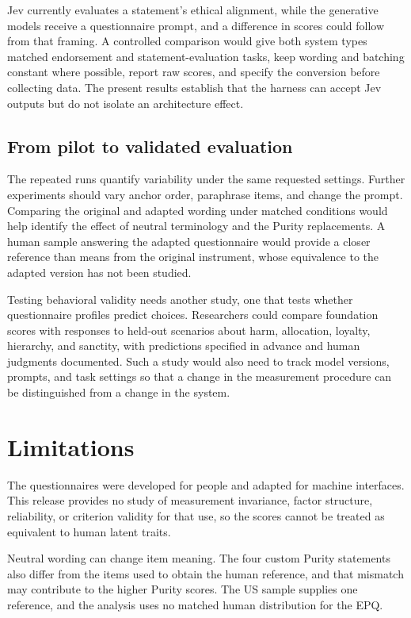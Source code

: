 \documentclass[11pt]{article}
\begin{document}
Jev currently evaluates a statement's ethical alignment, while the generative models receive a questionnaire prompt, and a difference in scores could follow from that framing. A controlled comparison would give both system types matched endorsement and statement-evaluation tasks, keep wording and batching constant where possible, report raw scores, and specify the conversion before collecting data. The present results establish that the harness can accept Jev outputs but do not isolate an architecture effect.

\subsection{From pilot to validated evaluation}
The repeated runs quantify variability under the same requested settings. Further experiments should vary anchor order, paraphrase items, and change the prompt. Comparing the original and adapted wording under matched conditions would help identify the effect of neutral terminology and the Purity replacements. A human sample answering the adapted questionnaire would provide a closer reference than means from the original instrument, whose equivalence to the adapted version has not been studied.

Testing behavioral validity needs another study, one that tests whether questionnaire profiles predict choices. Researchers could compare foundation scores with responses to held-out scenarios about harm, allocation, loyalty, hierarchy, and sanctity, with predictions specified in advance and human judgments documented. Such a study would also need to track model versions, prompts, and task settings so that a change in the measurement procedure can be distinguished from a change in the system.

\section{Limitations}
The questionnaires were developed for people and adapted for machine interfaces. This release provides no study of measurement invariance, factor structure, reliability, or criterion validity for that use, so the scores cannot be treated as equivalent to human latent traits.

Neutral wording can change item meaning. The four custom Purity statements also differ from the items used to obtain the human reference, and that mismatch may contribute to the higher Purity scores. The US sample supplies one reference, and the analysis uses no matched human distribution for the EPQ.
\end{document}
